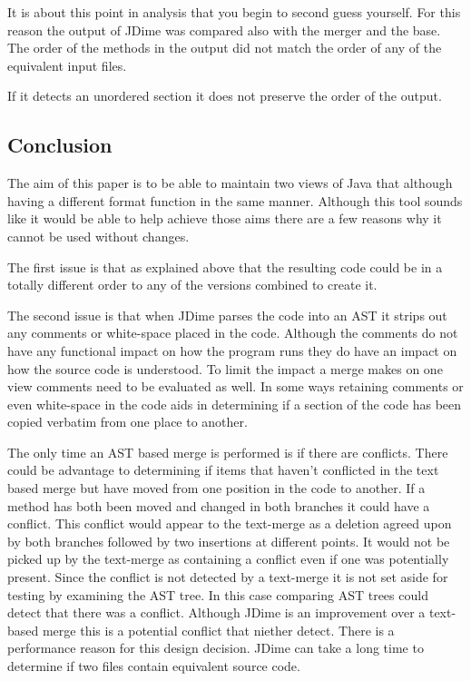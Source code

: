 It is about this point in analysis that you begin to second guess yourself.  For this reason the output of JDime was compared also with the merger and the base.  The order of the methods in the output did not match the order of any of the equivalent input files.  

If it detects an unordered section it does not preserve the order of the output.

\subsection{Conclusion}
The aim of this paper is to be able to maintain two views of Java that although having a different format function in the same manner.  Although this tool sounds like it would be able to help achieve those aims there are a few reasons why it cannot be used without changes.

The first issue is that as explained above that the resulting code could be in a totally different order to any of the versions combined to create it.

The second issue is that when JDime parses the code into an AST it strips out any comments or white-space placed in the code.  Although the comments do not have any functional impact on how the program runs they do have an impact on how the source code is understood.  To limit the impact a merge makes on one view comments need to be evaluated as well. In some ways retaining comments or even white-space in the code aids in determining if a section of the code has been copied verbatim from one place to another.

The only time an AST based merge is performed is if there are conflicts.  There could be advantage to determining if items that haven't conflicted in the text based merge but have moved from one position in the code to another.  If a method has both been moved and changed in both branches it could have a conflict.  This conflict would appear to the text-merge as a deletion agreed upon by both branches followed by two insertions at different points.  It would not be picked up by the text-merge as containing a conflict even if one was potentially present.  Since the conflict is not detected by a text-merge it is not set aside for testing by examining the AST tree. In this case comparing AST trees could detect that there was a conflict. Although JDime is an improvement over a text-based merge this is a potential conflict that niether detect. There is a performance reason for this design decision. JDime can take a long time to determine if two files contain equivalent source code.


